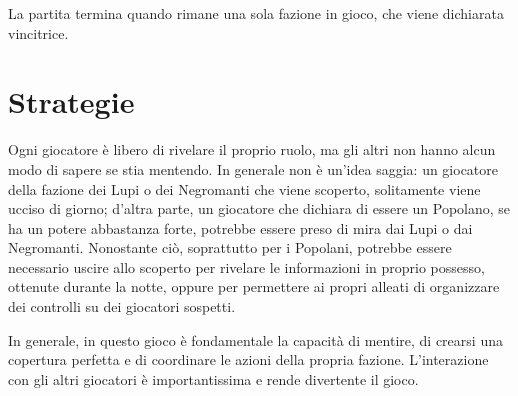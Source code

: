 \documentclass[a4paper,10pt]{article}
\begin{document}
La partita termina quando rimane una sola fazione in gioco, che viene dichiarata vincitrice.

\section{Strategie}

Ogni giocatore è libero di rivelare il proprio ruolo, ma gli altri non hanno
alcun modo di sapere se stia mentendo. 
In generale non è un'idea saggia:
un giocatore della fazione dei Lupi o dei Negromanti che viene scoperto, solitamente
viene ucciso di giorno; d'altra parte, un giocatore che dichiara di essere un Popolano,
se ha un potere abbastanza forte, potrebbe essere preso di mira dai Lupi o dai Negromanti.
Nonostante ciò, soprattutto per i Popolani, potrebbe essere necessario uscire allo
scoperto per rivelare le informazioni in proprio possesso, ottenute durante la notte,
oppure per permettere ai propri alleati di organizzare dei controlli su dei giocatori
sospetti.

In generale, in questo gioco è fondamentale la capacità di mentire, di crearsi una copertura
perfetta e di coordinare le azioni della propria fazione. L'interazione con gli altri
giocatori è importantissima e rende divertente il gioco.
\end{document}
